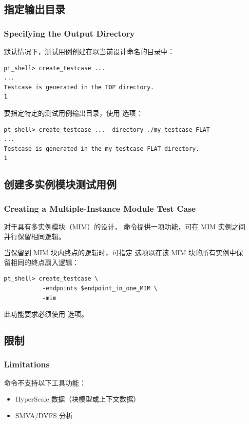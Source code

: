 \subsection{指定输出目录}
\subsubsection*{Specifying the Output Directory}

默认情况下，测试用例创建在以当前设计命名的目录中：
\begin{lstlisting}
pt_shell> create_testcase ...
...
Testcase is generated in the TOP directory.
1
\end{lstlisting}

要指定特定的测试用例输出目录，使用  选项：
\begin{lstlisting}
pt_shell> create_testcase ... -directory ./my_testcase_FLAT
...
Testcase is generated in the my_testcase_FLAT directory.
1
\end{lstlisting}

\subsection{创建多实例模块测试用例}
\subsubsection*{Creating a Multiple-Instance Module Test Case}

对于具有多实例模块（MIM）的设计， 命令提供一项功能，可在 MIM 实例之间并行保留相同逻辑。

当保留到 MIM 块内终点的逻辑时，可指定  选项以在该 MIM 块的所有实例中保留相同的终点扇入逻辑：
\begin{lstlisting}
pt_shell> create_testcase \
           -endpoints $endpoint_in_one_MIM \
           -mim
\end{lstlisting}

此功能要求必须使用  选项。

\subsection{限制}
\subsubsection*{Limitations}

 命令不支持以下工具功能：
\begin{itemize}
  \item HyperScale 数据（块模型或上下文数据）
  \item SMVA/DVFS 分析
\end{itemize}
